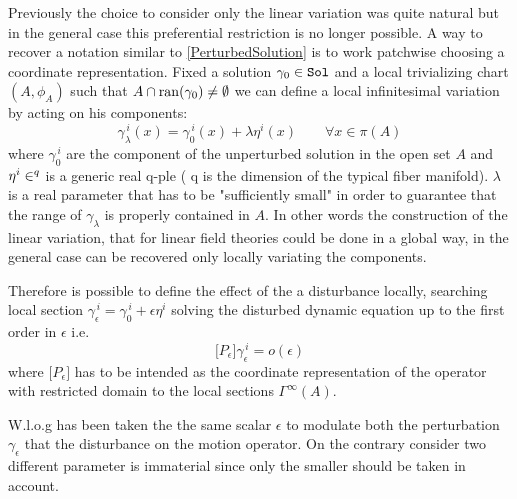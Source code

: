 \documentclass[Main]{subfiles}
\begin{document}
		Previously the choice to consider only the linear variation was quite natural but in the general case this preferential restriction is no longer possible.
		A way to  recover a notation similar to \ref{PerturbedSolution} is to work patchwise choosing a coordinate representation.
		Fixed a solution $\gamma_0 \in \mathtt{Sol}$ and a local trivializing chart $(A, \phi_A)$ such that $A\cap \mathrm{ran}(\gamma_0) \neq \emptyset$ we can define a local infinitesimal variation by acting on his components:
		\begin{displaymath}
			\gamma_\lambda ^{\, i}(x) = \gamma_0^{\, i}(x) + \lambda \eta^i(x) \qquad \forall x\in \pi(A)
		\end{displaymath}
		where $ \gamma_0^{\, i}$ are the component of the unperturbed solution in the open set $A$ and $\eta^i\in \real^q$ is a generic real q-ple ( q is the dimension of the typical fiber manifold).
		$\lambda$ is a real parameter that has to be "sufficiently small" in order to guarantee that the range of $\gamma_\lambda$ is properly contained in $A$.
		In other words the construction of the linear variation, that for linear field theories could be done in a global way, in the general case can be recovered only locally variating the components.
		
		Therefore is possible to define the effect of the a disturbance locally, searching local section $\gamma_\epsilon^{\, i} = \gamma_0^{\, i} + \epsilon \eta^{i}$ solving the disturbed dynamic equation up to the first order in $\epsilon$ i.e. 
		\begin{displaymath}
			\big[ P_\epsilon \big] \gamma_\epsilon^{\,i} = o(\epsilon)
		\end{displaymath}
		where $\big[ P_\epsilon \big] $ has to be intended as the coordinate representation of the operator with restricted domain to the local sections $\Gamma^\infty(A)$.
		\begin{observation}
		W.l.o.g has been taken the the same scalar $\epsilon$  to modulate both the perturbation $\gamma_\epsilon$ that the disturbance on the motion operator.
		On the contrary consider two different parameter is immaterial since only the smaller should be taken in account.
		\end{observation}
\end{document}
